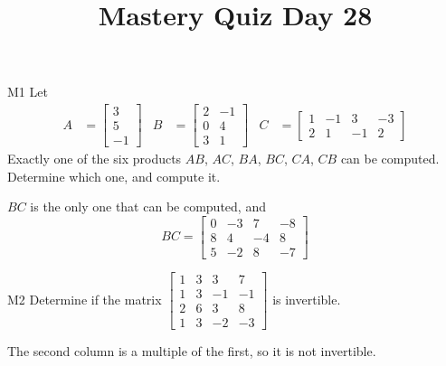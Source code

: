 \documentclass{sbgLAquiz}
\title{Mastery Quiz Day 28 }
\begin{document}
\begin{problem}{M1}
Let 
\begin{align*}
A &= \begin{bmatrix} 3 \\ 5 \\ -1  \end{bmatrix} & B &= \begin{bmatrix} 2 & -1 \\ 0 & 4 \\ 3 & 1 \end{bmatrix} & C&=\begin{bmatrix} 1 & -1 & 3 & -3 \\ 2 & 1 & -1 & 2 \end{bmatrix}
\end{align*}
Exactly one of the six products $AB$, $AC$, $BA$, $BC$, $CA$, $CB$ can be computed.  Determine which one, and compute it.
\end{problem}
\begin{solution}
$BC$ is the only one that can be computed, and
$$BC=\begin{bmatrix} 0 & -3 & 7 & -8 \\ 8 & 4 & -4 & 8 \\ 5 & -2 & 8 & -7 \end{bmatrix}$$
\end{solution}

\begin{problem}{M2}
Determine if the matrix $\begin{bmatrix} 1 & 3 & 3 & 7 \\ 1 & 3 & -1 & -1 \\ 2 & 6 & 3 & 8 \\ 1 & 3 & -2 & -3 \end{bmatrix}$ is invertible.
\end{problem}
\begin{solution}
The second column is a multiple of the first, so it is not invertible.
\end{solution}
\end{document}
